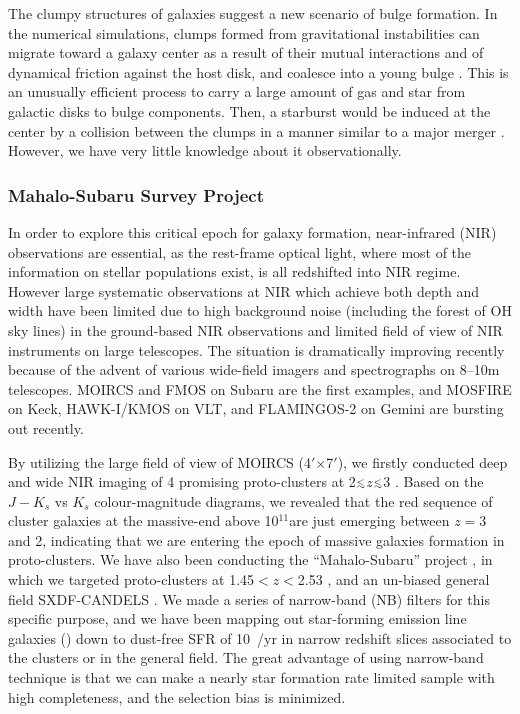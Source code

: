 The clumpy structures of galaxies suggest a new scenario of bulge formation. 
In the numerical simulations, clumps formed from gravitational instabilities can 
migrate toward a galaxy center as a result of their mutual interactions and of 
dynamical friction against the host disk, and coalesce into a young bulge 
\citep[e.g.,][]{inoue12}.
This is an unusually efficient process to carry a large amount of gas and 
star from galactic disks to bulge components. Then, a starburst would be 
induced at the center by a collision between the clumps in a manner similar 
to a major merger \citep{barnes96}. However, we have very little 
knowledge about it observationally.

\subsubsection{Mahalo-Subaru Survey Project}

In order to explore this critical epoch for galaxy formation,
near-infrared (NIR) observations are essential,
as the rest-frame optical light, where most of the information
on stellar populations exist, is all redshifted into NIR regime. 
However large systematic observations at NIR which achieve both depth
and width have been limited due to high background noise (including the
forest of OH sky lines) in the ground-based NIR observations and limited
field of view of NIR instruments on large telescopes. 
The situation is dramatically improving recently because of the advent
of various wide-field imagers and spectrographs on 8--10m telescopes. 
MOIRCS and FMOS on Subaru are the first examples, and MOSFIRE on Keck,
HAWK-I/KMOS on VLT, and FLAMINGOS-2 on Gemini are bursting out
recently. 

By utilizing the large field of view of MOIRCS (4$'$$\times$7$'$), 
we firstly conducted deep and wide NIR imaging of 4 promising
proto-clusters at 2$\lsim$$z$$\lsim$3 \citep{kodama07}.
Based on the $J-K_s$ vs $K_s$ colour-magnitude diagrams, we revealed
that the red sequence of cluster galaxies at the massive-end above
10$^{11}$\msun are just emerging between $z=3$ and 2, indicating that we
are entering the epoch of massive galaxies formation in proto-clusters.  
We have also been conducting the ``Mahalo-Subaru'' project 
\citep[MApping HAlpha and Lines of Oxygen with Subaru;][]{kodama13}, 
in which we targeted proto-clusters at 1.45$<$$z$$<$2.53 
\citep{hayashi10, hayashi11, hayashi12, tadaki12, koyama13a},
and an un-biased general field SXDF-CANDELS 
\citep[$z$=2.19 and 2.53 slices;][]{tadaki13, tadaki14}.
We made a series of narrow-band (NB) filters for this specific purpose,
and we have been mapping out star-forming emission line galaxies (\ha)
down to dust-free SFR of 10~\msun/yr in narrow redshift slices
associated to the clusters or in the general field. 
The great advantage of using narrow-band technique is that we can make a
nearly star formation rate limited sample with high completeness, and
the selection bias is minimized. 

